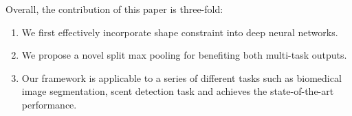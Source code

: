 Overall, the contribution of this paper is three-fold:
\begin{enumerate}
	\item We first effectively incorporate shape constraint into deep neural networks.
	\item We propose a novel split max pooling for benefiting both multi-task outputs.
	\item Our framework is applicable to a series of different tasks such as biomedical image segmentation, scent detection task and achieves the state-of-the-art performance.
\end{enumerate}
